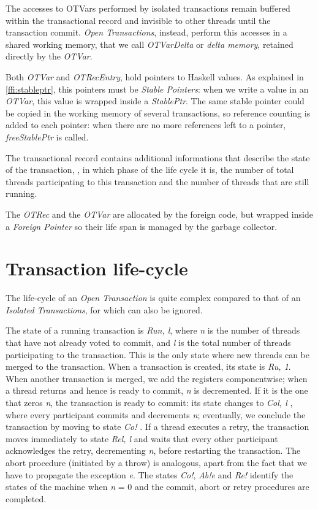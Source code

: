 The accesses to OTVars performed by isolated transactions remain buffered within the transactional record and invisible to other threads until the transaction commit. \emph{Open Transactions}, instead, perform this accesses in a shared working memory, that we call \emph{OTVarDelta} or \emph{delta memory}, retained directly by the \emph{OTVar}.

Both \emph{OTVar} and \emph{OTRecEntry}, hold pointers to Haskell values.
As explained in \cref{ffi:stableptr}, this pointers must be \emph{Stable Pointers}: when we write a value in an \emph{OTVar}, this value is wrapped inside a \emph{StablePtr}.
The same stable pointer could be copied in the working memory of several transactions, so reference counting is added to each pointer: when there are no more references left to a pointer, \emph{freeStablePtr} is called.

The transactional record contains additional informations that describe the state of the transaction, \ie, in which phase of the life cycle it is, the number of total threads participating to this transaction and the number of threads that are still running.

The \emph{OTRec} and the \emph{OTVar} are allocated by the foreign code, but wrapped inside a \emph{Foreign Pointer} so their life span is managed by the garbage collector.



\section{Transaction life-cycle}

The life-cycle of an \emph{Open Transaction} is quite complex compared to that of an \emph{Isolated Transactions}, for which can also be ignored.

The state of a running transaction is \emph{Ru\textlangle n, l\textrangle}, where \emph{n} is the number of threads that have not already voted to commit, and \emph{l} is the total number of threads participating to the transaction.
This is the only state where new threads can be merged to the transaction. When a transaction is created, its state is \emph{Ru, 1\textrangle}.
When another transaction is merged, we add the registers componentwise; when a thread returns and hence is ready to commit, \emph{n} is decremented.
If it is the one that zeros \emph{n}, the transaction is ready to commit: its state changes to \emph{Co\textlangle l, l\textrangle} , where every participant commits and decrements \emph{n}; eventually, we conclude the transaction by moving to state \emph{Co!\textlangle \textrangle} .
If a thread executes a retry, the transaction moves immediately to state \emph{Re\textlangle l, l\textrangle} and waits that every other participant acknowledges the retry, decrementing \emph{n}, before restarting the transaction.
The abort procedure (initiated by a throw) is analogous, apart from the fact that we have to propagate the exception \emph{e}.
The states \emph{Co!\textlangle \textrangle }, \emph{Ab!\textlangle e\textrangle}  and \emph{Re!\textlangle \textrangle}  identify the states of the machine when \emph{n} = 0 and the commit, abort or retry procedures are completed.

